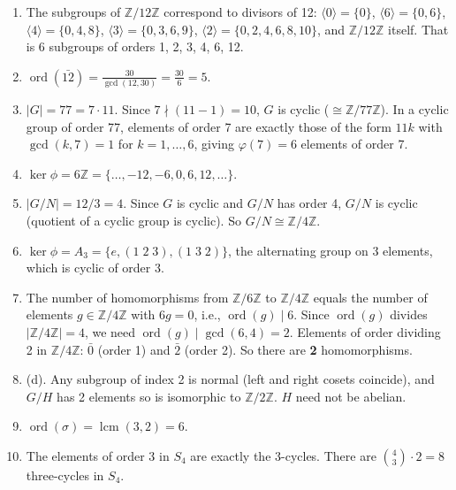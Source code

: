 \documentclass[11pt]{article}
\begin{document}
\begin{enumerate}
\item The subgroups of $\mathbb{Z}/12\mathbb{Z}$ correspond to divisors of 12: $\langle 0\rangle=\{0\}$, $\langle 6\rangle=\{0,6\}$, $\langle 4\rangle=\{0,4,8\}$, $\langle 3\rangle=\{0,3,6,9\}$, $\langle 2\rangle=\{0,2,4,6,8,10\}$, and $\mathbb{Z}/12\mathbb{Z}$ itself. That is 6 subgroups of orders 1, 2, 3, 4, 6, 12.

\item $\operatorname{ord}(\bar{12})=\frac{30}{\gcd(12,30)}=\frac{30}{6}=5$.

\item $|G|=77=7\cdot 11$. Since $7\nmid(11-1)=10$, $G$ is cyclic ($\cong\mathbb{Z}/77\mathbb{Z}$). In a cyclic group of order 77, elements of order 7 are exactly those of the form $11k$ with $\gcd(k,7)=1$ for $k=1,\ldots,6$, giving $\varphi(7)=6$ elements of order 7.

\item $\ker\phi = 6\mathbb{Z} = \{\ldots, -12, -6, 0, 6, 12, \ldots\}$.

\item $|G/N|=12/3=4$. Since $G$ is cyclic and $G/N$ has order 4, $G/N$ is cyclic (quotient of a cyclic group is cyclic). So $G/N\cong\mathbb{Z}/4\mathbb{Z}$.

\item $\ker\phi = A_3 = \{e, (1\;2\;3), (1\;3\;2)\}$, the alternating group on 3 elements, which is cyclic of order 3.

\item The number of homomorphisms from $\mathbb{Z}/6\mathbb{Z}$ to $\mathbb{Z}/4\mathbb{Z}$ equals the number of elements $g\in\mathbb{Z}/4\mathbb{Z}$ with $6g=0$, i.e., $\operatorname{ord}(g)\mid 6$. Since $\operatorname{ord}(g)$ divides $|\mathbb{Z}/4\mathbb{Z}|=4$, we need $\operatorname{ord}(g)\mid\gcd(6,4)=2$. Elements of order dividing 2 in $\mathbb{Z}/4\mathbb{Z}$: $\bar{0}$ (order 1) and $\bar{2}$ (order 2). So there are \textbf{2} homomorphisms.

\item (d). Any subgroup of index 2 is normal (left and right cosets coincide), and $G/H$ has 2 elements so is isomorphic to $\mathbb{Z}/2\mathbb{Z}$. $H$ need not be abelian.

\item $\operatorname{ord}(\sigma)=\operatorname{lcm}(3,2)=6$.

\item The elements of order 3 in $S_4$ are exactly the 3-cycles. There are $\binom{4}{3}\cdot 2 = 8$ three-cycles in $S_4$.


\end{enumerate}
\end{document}
